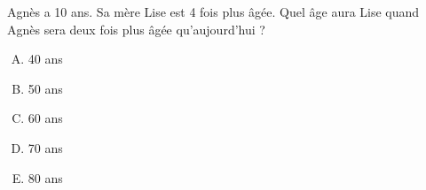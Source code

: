 Agnès a 10 ans. Sa mère Lise est 4 fois plus âgée. Quel âge aura Lise quand Agnès sera deux
fois plus âgée qu'aujourd'hui ?
\begin{multicols}{2}
  \begin{enumerate}[A)]
  \item 40 ans
  \item 50 ans
  \item 60 ans
  \item 70 ans
  \item 80 ans
  \end{enumerate}
\end{multicols}